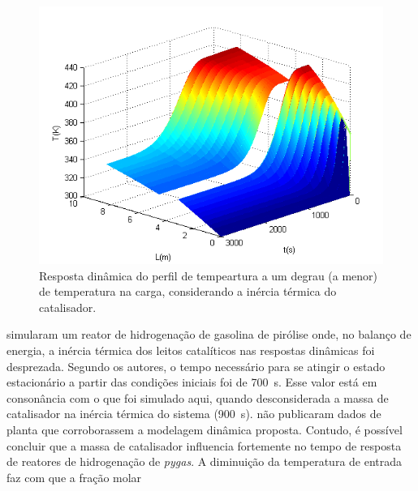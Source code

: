 \begin{figure}[htb]
\centering
\includegraphics[scale=0.8]{images/Chap4/Feed_T_300K_catalyst_influence.png}
\caption{Resposta dinâmica do perfil de tempeartura a um degrau (a menor) de
temperatura na carga, considerando a inércia térmica do catalisador.}
\label{fig:Feed_T_300K_catalyst_influence}
\end{figure}
 simularam um reator de hidrogenação de
gasolina de pirólise onde, no balanço de energia, a inércia térmica dos leitos
catalíticos nas respostas dinâmicas foi desprezada. Segundo os autores, o tempo
necessário para se atingir o estado estacionário a partir das condições
iniciais foi de \SI{700}{s}. Esse valor está em consonância com o que foi
simulado aqui, quando desconsiderada a massa de catalisador na inércia térmica
do sistema (\SI{900}{s}).  não publicaram dados
de planta que corroborassem a modelagem dinâmica proposta. Contudo, é possível
concluir que a massa de catalisador influencia fortemente no tempo de resposta
de reatores de hidrogenação de \emph{pygas}.
% 
A diminuição da temperatura de entrada faz com que a fração molar

